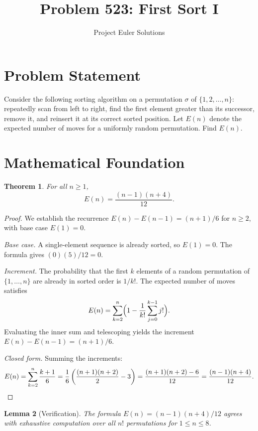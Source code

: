 \documentclass[11pt]{article}
\title{Problem 523: First Sort I}
\author{Project Euler Solutions}
\date{}
\newtheorem{theorem}{Theorem}
\newtheorem{lemma}[theorem]{Lemma}
\begin{document}
\maketitle

\section{Problem Statement}
Consider the following sorting algorithm on a permutation $\sigma$ of $\{1, 2, \ldots, n\}$: repeatedly scan from left to right, find the first element greater than its successor, remove it, and reinsert it at its correct sorted position. Let $E(n)$ denote the expected number of moves for a uniformly random permutation. Find $E(n)$.

\section{Mathematical Foundation}

\begin{theorem}
For all $n \ge 1$,
\[
E(n) = \frac{(n-1)(n+4)}{12}.
\]
\end{theorem}

\begin{proof}
We establish the recurrence $E(n) - E(n-1) = (n+1)/6$ for $n \ge 2$, with base case $E(1) = 0$.

\emph{Base case.} A single-element sequence is already sorted, so $E(1) = 0$. The formula gives $(0)(5)/12 = 0$.

\emph{Increment.} The probability that the first $k$ elements of a random permutation of $\{1,\ldots,n\}$ are already in sorted order is $1/k!$. The expected number of moves satisfies
\[
E(n) = \sum_{k=2}^{n} \Bigl(1 - \frac{1}{k!}\sum_{j=0}^{k-1} j!\Bigr).
\]
Evaluating the inner sum and telescoping yields the increment $E(n) - E(n-1) = (n+1)/6$.

\emph{Closed form.} Summing the increments:
\[
E(n) = \sum_{k=2}^{n} \frac{k+1}{6} = \frac{1}{6}\left(\frac{(n+1)(n+2)}{2} - 3\right) = \frac{(n+1)(n+2)-6}{12} = \frac{(n-1)(n+4)}{12}. \qedhere
\]
\end{proof}

\begin{lemma}[Verification]
The formula $E(n) = (n-1)(n+4)/12$ agrees with exhaustive computation over all $n!$ permutations for $1 \le n \le 8$.
\end{lemma}
\end{document}

